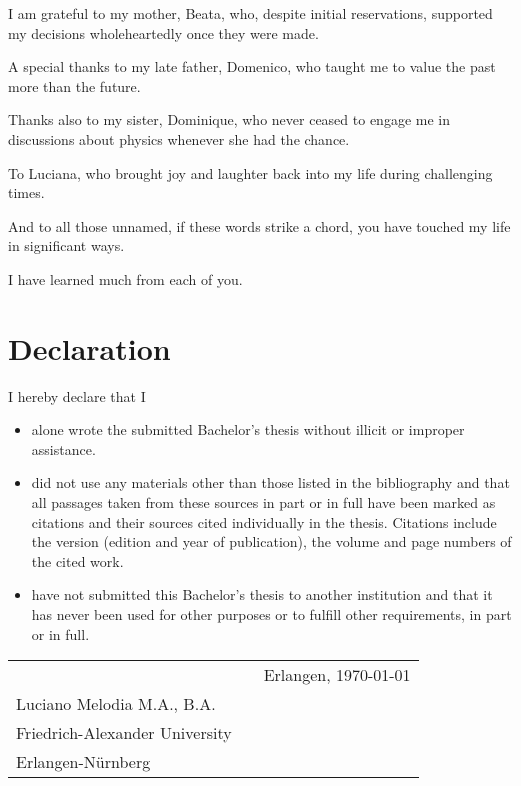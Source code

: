 \documentclass[b5paper, 12pt, twoside]{report}
\begin{document}
	I am grateful to my mother, Beata, who, despite initial reservations, supported my decisions wholeheartedly once they were made.

	A special thanks to my late father, Domenico, who taught me to value the past more than the future.

	Thanks also to my sister, Dominique, who never ceased to engage me in discussions about physics whenever she had the chance.

	To Luciana, who brought joy and laughter back into my life during challenging times.

	And to all those unnamed, if these words strike a chord, you have touched my life in significant ways.

	I have learned much from each of you.

	\chapter*{Declaration}

	I hereby declare that I

	\begin{itemize}
		\item alone wrote the submitted Bachelor's thesis without illicit or improper
			assistance.

		\item did not use any materials other than those listed in the bibliography and
			that all passages taken from these sources in part or in full have been marked
			as citations and their sources cited individually in the thesis. Citations
			include the version (edition and year of publication), the volume and page
			numbers of the cited work.

		\item have not submitted this Bachelor's thesis to another institution and that
			it has never been used for other purposes or to fulfill other requirements,
			in part or in full.
	\end{itemize}

	\vspace{2cm}
	\begin{tabular}{@{}p{3.5in}p{2in}p{2in}@{}}
		\hrulefill                                      &  & Erlangen, \today \\
		Luciano Melodia M.A., B.A.                      &  &                  \\
		Friedrich-Alexander University\\
		Erlangen-Nürnberg
	\end{tabular}
\end{document}
